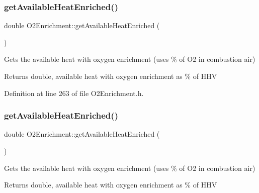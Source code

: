 \mbox{\label{class_o2_enrichment_afc7f9ea349f338ead76255218769a3e3}} 
\subsubsection{\texorpdfstring{get\+Available\+Heat\+Enriched()}{getAvailableHeatEnriched()}\hspace{0.1cm}{\footnotesize\ttfamily [1/3]}}
{\footnotesize\ttfamily double O2\+Enrichment\+::get\+Available\+Heat\+Enriched (\begin{DoxyParamCaption}{ }\end{DoxyParamCaption})\hspace{0.3cm}{\ttfamily [inline]}}

Gets the available heat with oxygen enrichment (uses \% of O2 in combustion air) \begin{DoxyReturn}{Returns}
double, available heat with oxygen enrichment as \% of H\+HV 
\end{DoxyReturn}


Definition at line 263 of file O2\+Enrichment.\+h.

\mbox{\label{class_o2_enrichment_afc7f9ea349f338ead76255218769a3e3}} 
\subsubsection{\texorpdfstring{get\+Available\+Heat\+Enriched()}{getAvailableHeatEnriched()}\hspace{0.1cm}{\footnotesize\ttfamily [2/3]}}
{\footnotesize\ttfamily double O2\+Enrichment\+::get\+Available\+Heat\+Enriched (\begin{DoxyParamCaption}{ }\end{DoxyParamCaption})\hspace{0.3cm}{\ttfamily [inline]}}

Gets the available heat with oxygen enrichment (uses \% of O2 in combustion air) \begin{DoxyReturn}{Returns}
double, available heat with oxygen enrichment as \% of H\+HV 
\end{DoxyReturn}


